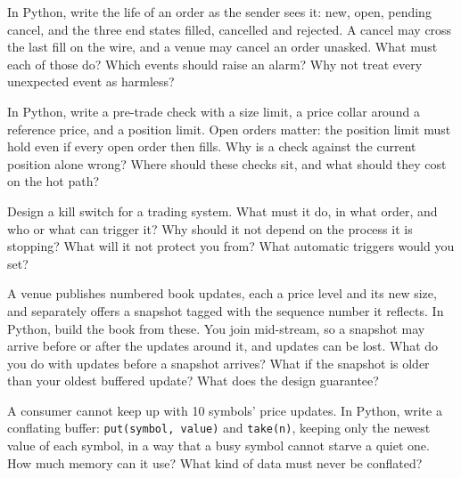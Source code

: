 \begin{question}\label{iq:iv3:system-design:10}
In Python, write the life of an order as the sender sees it: new, open, pending cancel, and the three end states filled, cancelled and rejected. A cancel may cross the last fill on the wire, and a venue may cancel an order unasked. What must each of those do? Which events should raise an alarm? Why not treat every unexpected event as harmless?
\end{question}

\begin{question}\label{iq:iv3:system-design:11}
In Python, write a pre-trade check with a size limit, a price collar around a reference price, and a position limit. Open orders matter: the position limit must hold even if every open order then fills. Why is a check against the current position alone wrong? Where should these checks sit, and what should they cost on the hot path?
\end{question}

\begin{question}\label{iq:iv3:system-design:12}
Design a kill switch for a trading system. What must it do, in what order, and who or what can trigger it? Why should it not depend on the process it is stopping? What will it not protect you from? What automatic triggers would you set?
\end{question}

\begin{question}\label{iq:iv3:system-design:13}
A venue publishes numbered book updates, each a price level and its new size, and separately offers a snapshot tagged with the sequence number it reflects. In Python, build the book from these. You join mid-stream, so a snapshot may arrive before or after the updates around it, and updates can be lost. What do you do with updates before a snapshot arrives? What if the snapshot is older than your oldest buffered update? What does the design guarantee?
\end{question}

\begin{question}\label{iq:iv3:system-design:14}
A consumer cannot keep up with 10 symbols' price updates. In Python, write a conflating buffer: \texttt{put(symbol, value)} and \texttt{take(n)}, keeping only the newest value of each symbol, in a way that a busy symbol cannot starve a quiet one. How much memory can it use? What kind of data must never be conflated?
\end{question}

